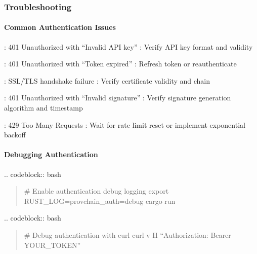 \documentclass[letterpaper,10pt,english]{sphinxmanual}
\begin{document}
\subsubsection{Troubleshooting}
\label{\detokenize{api/authentication:troubleshooting}}

\paragraph{Common Authentication Issues}
\label{\detokenize{api/authentication:common-authentication-issues}}
\sphinxAtStartPar
{}
\sphinxhyphen{} : 401 Unauthorized with “Invalid API key”
\sphinxhyphen{} : Verify API key format and validity

\sphinxAtStartPar
{}
\sphinxhyphen{} : 401 Unauthorized with “Token expired”
\sphinxhyphen{} : Refresh token or re\sphinxhyphen{}authenticate

\sphinxAtStartPar
{}
\sphinxhyphen{} : SSL/TLS handshake failure
\sphinxhyphen{} : Verify certificate validity and chain

\sphinxAtStartPar
{}
\sphinxhyphen{} : 401 Unauthorized with “Invalid signature”
\sphinxhyphen{} : Verify signature generation algorithm and timestamp

\sphinxAtStartPar
{}
\sphinxhyphen{} : 429 Too Many Requests
\sphinxhyphen{} : Wait for rate limit reset or implement exponential backoff


\paragraph{Debugging Authentication}
\label{\detokenize{api/authentication:debugging-authentication}}
\sphinxAtStartPar
{}
.. code\sphinxhyphen{}block:: bash
\begin{quote}

\sphinxAtStartPar
\# Enable authentication debug logging
export RUST\_LOG=provchain\_auth=debug
cargo run
\end{quote}

\sphinxAtStartPar
{}
.. code\sphinxhyphen{}block:: bash
\begin{quote}

\sphinxAtStartPar
\# Debug authentication with curl
curl \sphinxhyphen{}v \sphinxhyphen{}H “Authorization: Bearer YOUR\_TOKEN” 
\begin{quote}

\sphinxAtStartPar
{}
\end{quote}
\end{quote}
\end{document}
